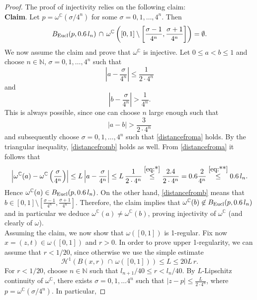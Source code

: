 \documentclass[12pt]{amsart}
\newcommand{\C}{\mathbb C}
\newcommand{\N}{\mathbb N}
\numberwithin{equation}{section}
\theoremstyle{plain}
\theoremstyle{definition}
\theoremstyle{remark}
\begin{document}
\begin{proof}
The proof of injectivity relies on the following claim:\medskip\\
  \textbf{Claim}. Let $p=\omega^\C(\sigma/4^n)$ for some $\sigma=0,1,\dots, 4^n$. Then
  \begin{equation}\label{eq:claim} B_{\rm Eucl}(p,0.6\, l_n)\,\cap\,\omega^\C\left([0,1]\setminus\left[\frac{\sigma-1}{4^n},\frac{\sigma +1}{4^n}\right]\right)=\emptyset. 
  \end{equation}
We now assume the claim and prove that $\omega^\C$ is injective. Let $0\leq a<b\leq 1$ and choose $n\in\N$, $\sigma=0,1,\dots, 4^n$ such that 
\begin{equation}\label{distancefroma}
    \left|a-\frac{\sigma}{4^n}\right|\leq \frac{1}{2\cdot4^n}
\end{equation}
and 
\begin{equation}\label{distancefromb}
   \left|b-\frac{\sigma}{4^n}\right|> \frac{1}{4^n}. 
\end{equation}
This is always possible, since one can choose $n$ large enough such that
\[|a-b|> \frac{3}{2\cdot4^n}\] and subsequently choose $\sigma=0,1,\dots,4^n$ such that \eqref{distancefroma} holds. By the triangular inequality, \eqref{distancefromb} holds as well.
From \eqref{distancefroma} it follows that 
\begin{equation}\label{eq:ainball}\left|\omega^\C(a)-\omega^\C\left(\frac{\sigma}{4^n}\right)\right|\leq L\left|a-\frac{\sigma}{4^n}\right|\leq L\,\frac{1}{2\cdot 4^n}\overset{\eqref{eq:*}}{\leq} \frac{2.4}{2\cdot 4^n}=0.6\frac{2}{4^n}\overset{\eqref{eq:**}}{\leq} 0.6 \,l_n.\end{equation} Hence $\omega^\C(a)\in B_{\rm Eucl}(p,0.6\, l_n)$. On the other hand,  \eqref{distancefromb} means that $b\in[0,1]\setminus [\frac{\sigma-1}{4^n},\frac{\sigma +1}{4^n}]$. Therefore, the claim implies that $\omega^\C(b)\not\in B_{\rm Eucl}(p,0.6\, l_n)$ and in particular we deduce $\omega^\C(a)\neq \omega^\C(b)$, proving injectivity of $\omega^\C$ (and clearly of $\omega$).\medskip\\
 Assuming the claim, we now show that $\omega([0,1])$ is 1-regular. Fix now $x=(z,t)\in \omega([0,1])$ and $r>0$. In order to prove upper 1-regularity, we can assume that $r<1/20$, since otherwise we use the simple estimate
  \[\mathcal H^1\left(B(x,r)\,\cap\,\omega\left([0,1]\right)\right)\leq  L\leq 20 L\,r.\]
For $r<1/20$,  choose $n\in\N$ such that $l_{n+1}/40\leq r<l_n/40$.
  By $L$-Lipschitz continuity of $\omega^\C$, there exists $\sigma=0,1,\dots 4^n$ such that $|z-p|\leq \frac{L}{2\cdot 4^n}$, where $p=\omega^\C(\sigma/4^n)$. In particular, %

\end{proof}
\end{document}
